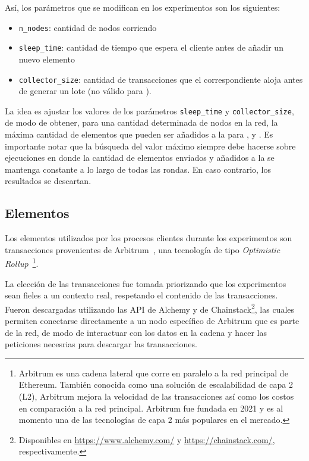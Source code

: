 Así, los parámetros que se modifican en los experimentos son los siguientes:
\begin{itemize}
	\item \texttt{n\_nodes}: cantidad de nodos corriendo
	\item \texttt{sleep\_time}: cantidad de tiempo que espera el cliente antes de añadir un nuevo elemento
	\item \texttt{collector\_size}: cantidad de transacciones que el correspondiente \collector aloja antes de generar
	un lote (no válido para \vanilla).
\end{itemize}
La idea es ajustar los valores de los parámetros \texttt{sleep\_time} y \texttt{collector\_size},
de modo de obtener, para una cantidad determinada de nodos en la red, la máxima cantidad de elementos que pueden ser
añadidos a la \setchain para \vanilla, \compresschain y \hashchain.
Es importante notar que la búsqueda del valor máximo siempre debe hacerse sobre ejecuciones en donde la cantidad de elementos
enviados y añadidos a la \setchain se mantenga constante a lo largo de todas las rondas.
En caso contrario, los resultados se descartan.


\subsection{Elementos}
Los elementos utilizados por los procesos clientes durante los experimentos son transacciones provenientes
de Arbitrum~\cite{Kalodner2018Arbitrum}, una tecnología de tipo \textit{Optimistic Rollup}~\footnote{
Arbitrum es una cadena lateral que corre en paralelo a la red principal de Ethereum.
También conocida como una solución de escalabilidad de capa 2 (L2), Arbitrum mejora la velocidad de las transacciones así
como los costos en comparación a la red principal.
Arbitrum fue fundada en 2021 y es al momento una de las tecnologías de capa 2 más populares en el mercado.}.
%

La elección de las transacciones fue tomada priorizando que los experimentos sean fieles a un contexto
real, respetando el contenido de las transacciones.
%
Fueron descargadas utilizando las API de Alchemy y de Chainstack\footnote{Disponibles en \url{https://www.alchemy.com/} y \url{https://chainstack.com/},
respectivamente.}, las
cuales permiten conectarse directamente a un nodo específico de Arbitrum que es parte de la red,
de modo de interactuar con los datos en la cadena y hacer las peticiones necesrias para descargar las transacciones.

